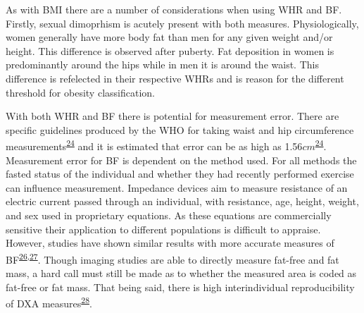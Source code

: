 \documentclass[11pt,twoside]{bristolthesis}
\begin{document}
As with BMI there are a number of considerations when using WHR and BF. Firstly, sexual dimoprhism is acutely present with both measures. Physiologically, women generally have more body fat than men for any given weight and/or height. This difference is observed after puberty. Fat deposition in women is predominantly around the hips while in men it is around the waist. This difference is refelected in their respective WHRs and is reason for the different threshold for obesity classification.

With both WHR and BF there is potential for measurement error. There are specific guidelines produced by the WHO for taking waist and hip circumference measurements\textsuperscript{\protect\hyperlink{ref-WHO2008}{24}} and it is estimated that error can be as high as 1.56\(cm\)\textsuperscript{\protect\hyperlink{ref-WHO2008}{24}}. Measurement error for BF is dependent on the method used. For all methods the fasted status of the individual and whether they had recently performed exercise can influence measurement. Impedance devices aim to measure resistance of an electric current passed through an individual, with resistance, age, height, weight, and sex used in proprietary equations. As these equations are commercially sensitive their application to different populations is difficult to appraise. However, studies have shown similar results with more accurate measures of BF\textsuperscript{\protect\hyperlink{ref-Jebb2000}{26},\protect\hyperlink{ref-Chouinard2007}{27}}. Though imaging studies are able to directly measure fat-free and fat mass, a hard call must still be made as to whether the measured area is coded as fat-free or fat mass. That being said, there is high interindividual reproducibility of DXA measures\textsuperscript{\protect\hyperlink{ref-Tallroth2013}{28}}.
\end{document}
